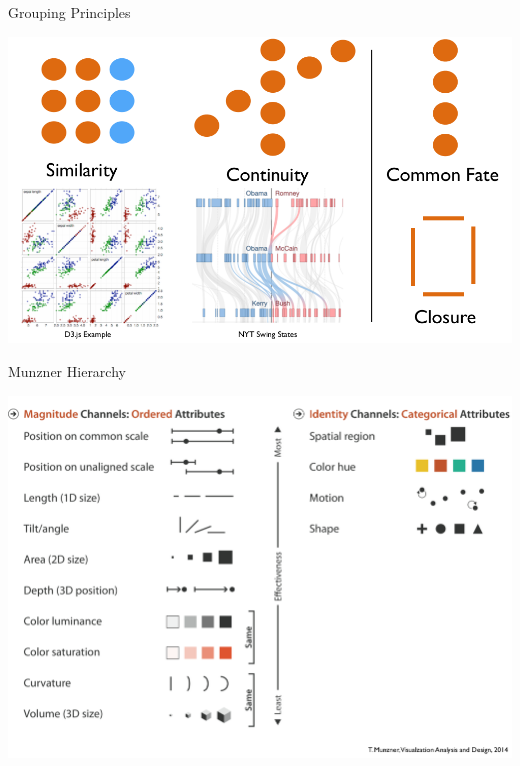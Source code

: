 \documentclass{beamer}
\begin{document}
\begin{frame}{Grouping Principles}
    \begin{center}
        \includegraphics[scale=0.3]{groupingPrinciples2.png}
    \end{center}
\end{frame}  
\begin{frame}{Munzner Hierarchy}
    \begin{center}
        \includegraphics[scale=0.3]{munznerHierarchy.png}
    \end{center}
\end{frame}  
\end{document}
